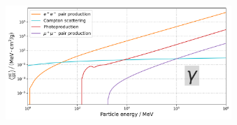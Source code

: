 \begin{frame}{}
\begin{minipage}[t][1cm][t]{\textwidth}
\begin{columns}[t]
\begin{figure}
    \end{figure}
    \vspace{-10pt}
    \begin{figure}
      \includegraphics[width=\linewidth, height=.4\textheight, keepaspectratio]{plots/photon_dEdx.png}
    \end{figure}
  \end{columns}

  \end{minipage}
\end{frame}


